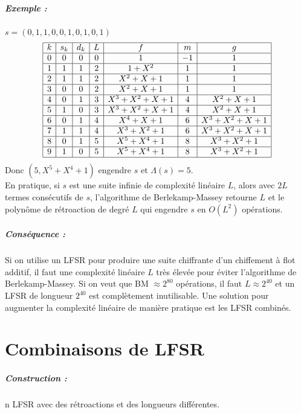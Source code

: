 \documentclass[12pt,a4paper]{report}
\begin{document}
\paragraph{Exemple :} $s=(0,1,1,0,0,1,0,1,0,1)$\\
$$ \begin{array}{|c|c|c|c|c|c|c|}\hline
k & s_k & d_k & L & f & m & g \\\hline
0 & 0 & 0 & 0 & 1 & -1 & 1 \\\hline
1 & 1 & 1 & 2 & 1 + X^2 & 1 & 1 \\\hline
2 & 1 & 1 & 2 & X^2 + X +1 & 1 & 1 \\\hline
3 & 0 & 0 & 2 & X^2 + X +1 & 1 & 1 \\\hline
4& 0 & 1 & 3 & X^3+X^2+X+1 & 4 & X^2+X+1 \\\hline
5 & 1 & 0 & 3 &  X^3+X^2+X+1& 4 & X^2+X+1 \\\hline
6 & 0 & 1 & 4 & X^4 + X +1 & 6 &  X^3+X^2+X+1 \\\hline
7 & 1 & 1 & 4 & X^3 +X^2 + 1 & 6 &  X^3+X^2+X+1 \\\hline
8 & 0 & 1 & 5 & X^5 + X^4 +1 & 8 & X^3 + X^2+1 \\\hline
9 & 1 & 0 & 5 & X^5 + X^4 +1 & 8 & X^3 + X^2+1 \\\hline
\end{array} $$
Donc $(5, X^5+ X^4+1)$ engendre $s$ et $\Lambda(s) = 5$.\\
En pratique, si $s$ est une suite infinie de complexité linéaire $L$, alors avec $2L$ termes consécutifs de $s$, l'algorithme de Berlekamp-Massey retourne $L$ et le polynôme de rétroaction de degré $L$ qui engendre $s$ en $O(L^2)$ opérations.
\paragraph{Conséquence :\\}
Si on utilise un LFSR pour produire une suite chiffrante d'un chiffement à flot additif, il faut une complexité linéaire $L$ très élevée pour éviter l'algorithme de Berlekamp-Massey. Si on veut que BM $\approx 2^{80}$ opérations, il faut $L \approx 2^{40}$ et un LFSR de longueur $2^{40}$ est complètement inutilisable. Une solution pour augmenter la complexité linéaire de manière pratique est les LFSR combinés.

\chapter{Combinaisons de LFSR}
\paragraph{Construction :}
n LFSR avec des rétroactions et des longueurs différentes.
\begin{figure}[h!]
	\centering
  \scalebox{0.6}{}	
\end{figure}
\end{document}
